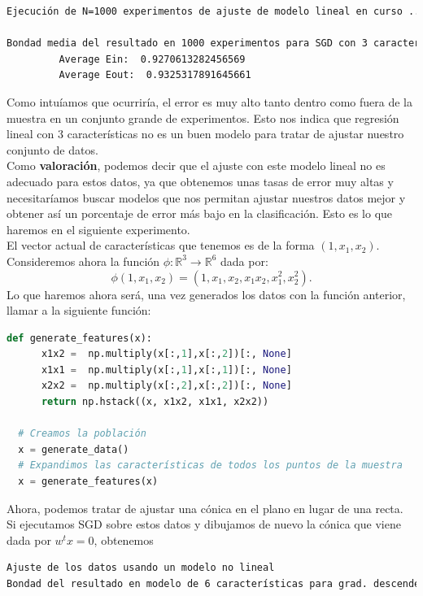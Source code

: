 \documentclass[12pt]{scrartcl}
\begin{document}
{\begin{lstlisting}[language=bash]
Ejecución de N=1000 experimentos de ajuste de modelo lineal en curso ...

Bondad media del resultado en 1000 experimentos para SGD con 3 características
         Average Ein:  0.9270613282456569
         Average Eout:  0.9325317891645661

\end{lstlisting}
Como intuíamos que ocurriría, el error es muy alto tanto dentro como fuera de la muestra en un conjunto grande de experimentos. Esto nos indica que regresión lineal con 3 características no es un 
buen modelo para tratar de ajustar nuestro conjunto de datos. \\

Como \textbf{valoración}, podemos decir que el ajuste con este modelo lineal no es adecuado para estos datos, ya que obtenemos unas tasas de error muy altas y necesitaríamos buscar modelos que nos permitan
ajustar nuestros datos mejor y obtener así un porcentaje de error más bajo en la clasificación. Esto es lo que haremos en el siguiente experimento.\\

El vector actual de características que tenemos es de la forma $(1,x_1,x_2)$. Consideremos ahora  la función $\phi : \mathbb R^3 \to \mathbb R^6$ dada por:
$$
\phi(1,x_1,x_2) = (1,x_1,x_2,x_1x_2,x_1^2,x_2^2).
$$
Lo que haremos ahora será, una vez generados los datos con la función anterior, llamar a la siguiente función:

\begin{lstlisting}[language=Python]
  def generate_features(x):
	  x1x2 =  np.multiply(x[:,1],x[:,2])[:, None]
	  x1x1 =  np.multiply(x[:,1],x[:,1])[:, None]
	  x2x2 =  np.multiply(x[:,2],x[:,2])[:, None]
	  return np.hstack((x, x1x2, x1x1, x2x2))

  # Creamos la población
  x = generate_data()
  # Expandimos las características de todos los puntos de la muestra
  x = generate_features(x)
\end{lstlisting}

Ahora, podemos tratar de ajustar una cónica en el plano en lugar de una recta. Si ejecutamos SGD sobre estos datos y dibujamos de nuevo la cónica que viene dada por $w^t x = 0$, obtenemos 


\begin{lstlisting}[language=bash]
Ajuste de los datos usando un modelo no lineal
Bondad del resultado en modelo de 6 características para grad. descendente estocastico en 2000 iteraciones:


\end{lstlisting}}
\end{document}
